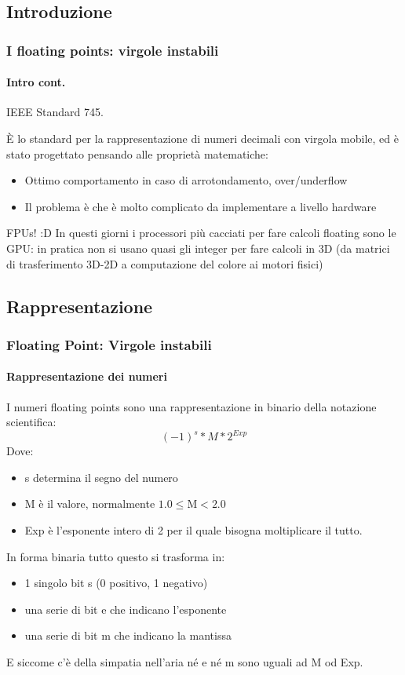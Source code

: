 \documentclass{beamer}
\begin{document}
  \subsection{Introduzione}
  \begin{frame}
    \frametitle{I floating points: virgole instabili}
    \framesubtitle{Intro cont.}
      IEEE Standard 745.
      
      \vspace{2em}
      
      È lo standard per la rappresentazione di numeri decimali con virgola mobile, ed è stato progettato
      pensando alle proprietà matematiche:
      
      \begin{itemize}
      		\item Ottimo comportamento in caso di arrotondamento, over/underflow
      		\item Il problema è che è molto complicato da implementare a livello hardware
      \end{itemize}
      
      \begin{block}{FPUs! :D}
      		In questi giorni i processori più cacciati per fare calcoli floating sono le GPU:
      		in pratica non si usano quasi gli integer per fare calcoli in 3D (da matrici di trasferimento
      		3D-2D a computazione del colore ai motori fisici)
      \end{block}
  \end{frame}
  	\subsection{Rappresentazione}
  \begin{frame}
    \frametitle{Floating Point: Virgole instabili}
    \framesubtitle{Rappresentazione dei numeri}
    I numeri floating points sono una rappresentazione in binario della notazione scientifica:
    $$(-1)^{s} * M * 2^{Exp}$$
    Dove:
    \begin{itemize}
    		\item s determina il segno del numero
    		\item M è il valore, normalmente $1.0 \leq \text{M} < 2.0$
    		\item Exp è l'esponente intero di 2 per il quale bisogna moltiplicare il tutto.
    \end{itemize}
    In forma binaria tutto questo si trasforma in:
    \begin{itemize}
    		\item 1 singolo bit s (0 positivo, 1 negativo)
    		\item una serie di bit e che indicano l'esponente
    		\item una serie di bit m che indicano la mantissa
    \end{itemize}
    E siccome c'è della simpatia nell'aria né e né m sono uguali ad M od Exp.
  \end{frame}
   
\end{document}
